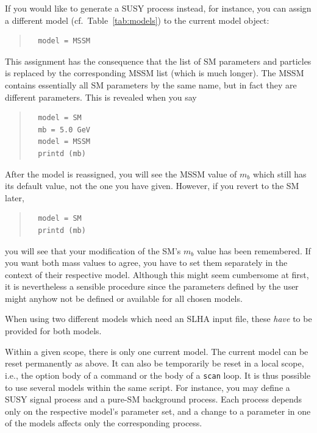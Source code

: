 \documentclass[12pt]{book}
\newcommand{\ttt}[1]{\texttt{#1}}
\begin{document}
If you would like to generate a SUSY process instead, for instance, you can
assign a different model (cf.\ Table~\ref{tab:models}) to the current model
object:
\begin{quote}
\begin{footnotesize}
\begin{verbatim}
  model = MSSM  
\end{verbatim}
\end{footnotesize}
\end{quote}
This assignment has the consequence that the list of SM parameters and
particles is replaced by the corresponding MSSM list (which is much longer).
The MSSM contains essentially all SM parameters by the same name, but in fact
they are different parameters.  This is revealed when you say
\begin{quote}
\begin{footnotesize}
\begin{verbatim}
  model = SM  
  mb = 5.0 GeV  
  model = MSSM
  printd (mb)  
\end{verbatim}
\end{footnotesize}
\end{quote}
After the model is reassigned, you will see the MSSM value of $m_b$ which
still has its default value, not the one you have given.  However, if you
revert to the SM later,
\begin{quote}
\begin{footnotesize}
\begin{verbatim}
  model = SM  
  printd (mb)  
\end{verbatim}
\end{footnotesize}
\end{quote}
you will see that your modification of the SM's $m_b$ value has been
remembered.  If you want both mass values to agree, you have to set them
separately in the context of their respective model.  Although this might seem
cumbersome at first, it is nevertheless a sensible procedure since the
parameters defined by the user might anyhow not be defined or available for
all chosen models.

When using two different models which need an SLHA input file, 
these {\em have} to be provided for both models.

Within a given scope, there is only one current model.  The current model can
be reset permanently as above.  It can also be temporarily be reset in a local
scope, i.e., the option body of a command or the body of a \ttt{scan} loop.
It is thus possible to use several models within the same script.  For
instance, you may define a SUSY signal process and a pure-SM background
process. Each process depends only on the respective model's parameter set,
and a change to a parameter in one of the models affects only the
corresponding process.
\end{document}
